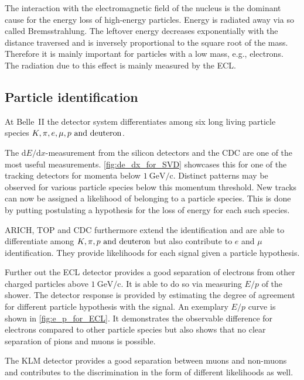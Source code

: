 The interaction with the electromagnetic field of the nucleus is the dominant cause for the energy loss of high-energy particles. Energy is radiated away via so called Bremsstrahlung. The leftover energy decreases exponentially with the distance traversed and is inversely proportional to the square root of the mass. Therefore it is mainly important for particles with a low mass, e.g., electrons. The radiation due to this effect is mainly measured by the ECL.

\subsection{Particle identification}
\label{sec:particle_identification}

At Belle~\RN{2} the detector system differentiates among six long living particle species $K, \pi, e, \mu, p \text{ and } \hbox{deuteron}$.

The $\mathrm{d}E/\mathrm{d}x$-measurement from the silicon detectors and the CDC are one of the most useful measurements. \autoref{fig:de_dx_for_SVD} showcases this for one of the tracking detectors for momenta below $1 \mathrm{~GeV/c}$. Distinct patterns may be observed for various particle species below this momentum threshold.
New tracks can now be assigned a likelihood of belonging to a particle species. This is done by putting postulating a hypothesis for the loss of energy for each such species.

ARICH, TOP and CDC furthermore extend the identification and are able to differentiate among $K, \pi, p \text{ and } \hbox{deuteron}$ but also contribute to $e$ and $\mu$ identification. They provide likelihoods for each signal given a particle hypothesis.

Further out the ECL detector provides a good separation of electrons from other charged particles above $1 \mathrm{~GeV/c}$. It is able to do so via measuring $E/p$ of the shower. The detector response is provided by estimating the degree of agreement for different particle hypothesis with the signal. An exemplary $E/p$ curve is shown in \autoref{fig:e_p_for_ECL}. It demonstrates the observable difference for electrons compared to other particle species but also shows that no clear separation of pions and muons is possible.

The KLM detector provides a good separation between muons and non-muons and contributes to the discrimination in the form of different likelihoods as well.

